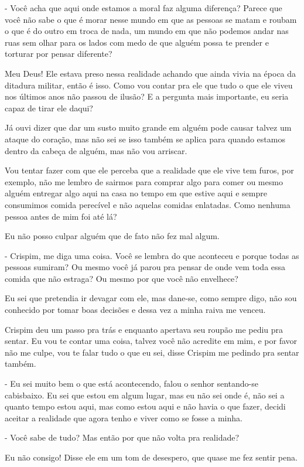 - Você acha que aqui onde estamos a moral faz alguma diferença? Parece que você não sabe o que é morar nesse mundo em que as pessoas se matam e roubam o que é do outro em troca de nada, um mundo em que não podemos andar nas ruas sem olhar para os lados com medo de que alguém possa te prender e torturar por pensar diferente?

Meu Deus! Ele estava preso nessa realidade achando que ainda vivia na época da ditadura militar, então é isso. Como vou contar pra ele que tudo o que ele viveu nos últimos anos não passou de ilusão? E a pergunta mais importante, eu seria capaz de tirar ele daqui?

Já ouvi dizer que dar um susto muito grande em alguém pode causar talvez um ataque do coração, mas não sei se isso também se aplica para quando estamos dentro da cabeça de alguém, mas não vou arriscar.

Vou tentar fazer com que ele perceba que a realidade que ele vive tem furos, por exemplo, não me lembro de sairmos para comprar algo para comer ou mesmo alguém entregar algo aqui na casa no tempo em que estive aqui e sempre consumimos comida perecível e não aquelas comidas enlatadas. Como nenhuma pessoa antes de mim foi até lá?

Eu não posso culpar alguém que de fato não fez mal algum.

- Crispim, me diga uma coisa. Você se lembra do que aconteceu e porque todas as pessoas sumiram? Ou mesmo você já parou pra pensar de onde vem toda essa comida que não estraga? Ou mesmo por que você não envelhece?

Eu sei que pretendia ir devagar com ele, mas dane-se, como sempre digo, não sou conhecido por tomar boas decisões e dessa vez a minha raiva me venceu.

Crispim deu um passo pra trás e enquanto apertava seu roupão me pediu pra sentar. Eu vou te contar uma coisa, talvez você não acredite em mim, e por favor não me culpe, vou te falar tudo o que eu sei, disse Crispim me pedindo pra sentar também.

- Eu sei muito bem o que está acontecendo, falou o senhor sentando-se cabisbaixo. Eu sei que estou em algum lugar, mas eu não sei onde é, não sei a quanto tempo estou aqui, mas como estou aqui e não havia o que fazer, decidi aceitar a realidade que agora tenho e viver como se fosse a minha.

- Você sabe de tudo? Mas então por que não volta pra realidade?

Eu não consigo! Disse ele em um tom de desespero, que quase me fez sentir pena.

